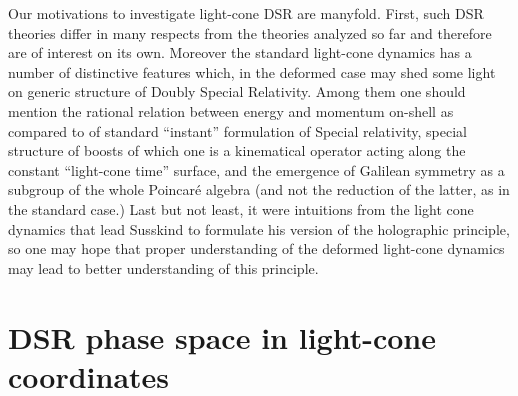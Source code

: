 \documentclass [12pt]  {article}
\def\vP{\vec{P}\, {}^2}
\begin{document}
Our motivations to investigate light-cone DSR are manyfold. First,
such  DSR theories differ in many respects from the theories
analyzed so far and therefore are of interest on its own. Moreover
the standard light-cone dynamics has a number of distinctive
features which, in the deformed case may shed some light on
generic structure of Doubly Special Relativity. Among them one
should mention the rational relation between energy and momentum
on-shell \myHighlight{$P_- = \frac{\vP + m^2}{P_+}$}\coordHE{} as compared to \myHighlight{$P_0
=\sqrt{\vP + m^2}$}\coordHE{} of standard ``instant'' formulation of Special
relativity, special structure of boosts of which one is a
kinematical operator acting along the constant ``light-cone time''
surface, and the emergence of Galilean symmetry  as a subgroup of
the whole Poincar\'e algebra (and not the reduction of the latter,
as in the standard case.) Last but not least, it were intuitions
from the light cone dynamics that lead Susskind \cite{Susskind} to
formulate his version of the holographic principle, so one may
hope that proper understanding of the deformed light-cone dynamics
may lead to better understanding of this principle.

\section{DSR phase space in light-cone coordinates}
\end{document}
